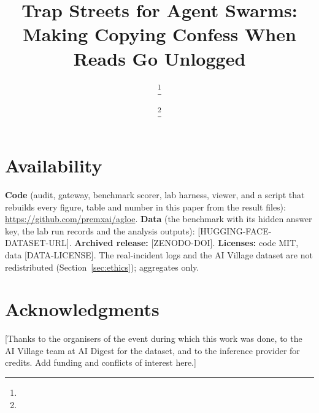 \documentclass[11pt]{article}
\title{Trap Streets for Agent Swarms:\\[3pt]\large Making Copying Confess When Reads Go Unlogged}
\author{%
  \ph{Author One}\thanks{\ph{Affiliation, city, country. Email.}} \and
  \ph{Author Two}\thanks{\ph{Affiliation, city, country. Email.}}%
}
\date{\ph{Month Year}}
\newcommand{\ph}[1]{{\color{red}[#1]}}
\theoremstyle{remark}
\begin{document}
\maketitle















\section*{Availability}
\textbf{Code} (audit, gateway, benchmark scorer, lab harness, viewer, and a script that rebuilds every figure, table and number in this paper from the result files): \url{https://github.com/premxai/agloe}. \textbf{Data} (the benchmark with its hidden answer key, the lab run records and the analysis outputs): \ph{HUGGING-FACE-DATASET-URL}. \textbf{Archived release:} \ph{ZENODO-DOI}. \textbf{Licenses:} code MIT, data \ph{DATA-LICENSE}. The real-incident logs and the AI Village dataset are not redistributed (Section~\ref{sec:ethics}); aggregates only.

\section*{Acknowledgments}
\ph{Thanks to the organisers of the event during which this work was done, to the AI Village team at AI Digest for the dataset, and to the inference provider for credits. Add funding and conflicts of interest here.}




\appendix






\end{document}
